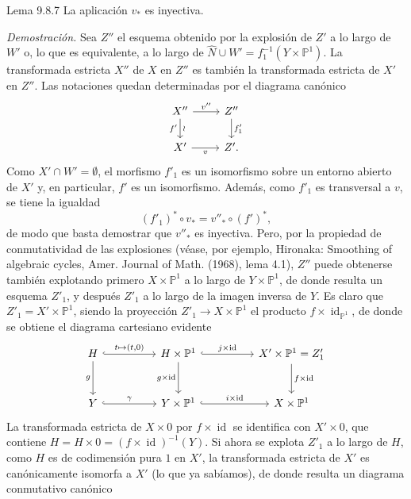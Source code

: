 \begin{statement}{Lema 9.8.7}
La aplicación $v_*$ es inyectiva.
\end{statement}

\emph{Demostración.} Sea $Z''$ el esquema obtenido por la explosión de $Z'$ a lo largo de $W'$ o, lo que es equivalente, a lo largo de $\widehat N\cup W'=f_1^{-1}(Y\times\mathbb P^1)$. La transformada estricta $X''$ de $X$ en $Z''$ es también la transformada estricta de $X'$ en $Z''$. Las notaciones quedan determinadas por el diagrama canónico
\[
\begin{tikzcd}
X''\arrow[r,"v''"]\arrow[d,"f'"',"\wr"]&Z''\arrow[d,"f'_1"]\\
X'\arrow[r,"v"']&Z'.
\end{tikzcd}
\]
Como $X'\cap W'=\emptyset$, el morfismo $f'_1$ es un isomorfismo sobre un entorno abierto de $X'$ y, en particular, $f'$ es un isomorfismo. Además, como $f'_1$ es transversal a $v$, se tiene la igualdad
\[
(f'_1)^*\circ v_*=v''_*\circ(f')^*,
\tag{9.8.8}
\]
de modo que basta demostrar que $v''_*$ es inyectiva. Pero, por la propiedad de conmutatividad de las explosiones (véase, por ejemplo, Hironaka: Smoothing of algebraic cycles, Amer. Journal of Math. (1968), lema 4.1), $Z''$ puede obtenerse también explotando primero $X\times\mathbb P^1$ a lo largo de $Y\times\mathbb P^1$, de donde resulta un esquema $Z'_1$, y después $Z'_1$ a lo largo de la imagen inversa de $Y$. Es claro que $Z'_1=X'\times\mathbb P^1$, siendo la proyección $Z'_1\to X\times\mathbb P^1$ el producto $f\times\operatorname{id}_{\mathbb P^1}$, de donde se obtiene el diagrama cartesiano evidente
\[
\begin{tikzcd}[column sep=huge,row sep=large]
H\arrow[r,hook,"{t\mapsto(t,0)}"]\arrow[d,"g"']&H\times\mathbb P^1\arrow[r,hook,"{j\times\operatorname{id}}"]\arrow[d,"{g\times\operatorname{id}}"']&X'\times\mathbb P^1=Z'_1\arrow[d,"{f\times\operatorname{id}}"]\\
Y\arrow[r,hook,"\gamma"]&Y\times\mathbb P^1\arrow[r,hook,"{i\times\operatorname{id}}"]&X\times\mathbb P^1
\end{tikzcd}
\]
La transformada estricta de $X\times0$ por $f\times\operatorname{id}$ se identifica con $X'\times0$, que contiene $H=H\times0=(f\times\operatorname{id})^{-1}(Y)$. Si ahora se explota $Z'_1$ a lo largo de $H$, como $H$ es de codimensión pura $1$ en $X'$, la transformada estricta de $X'$ es canónicamente isomorfa a $X'$ (lo que ya sabíamos), de donde resulta un diagrama conmutativo canónico
